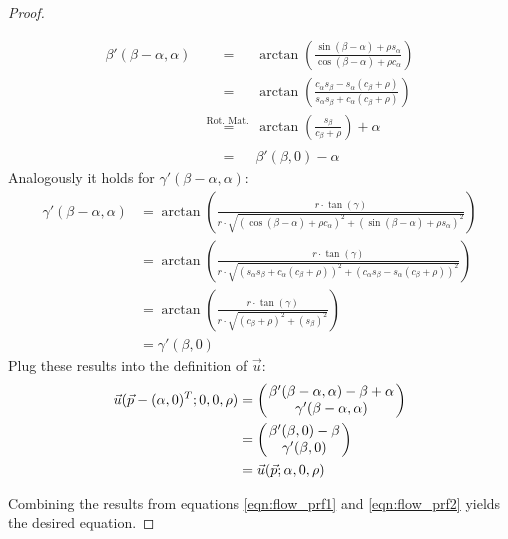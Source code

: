 \begin{proof}
\begin{enumerate}[1.]
\begin{align*}
 \beta'(\beta - \alpha, \alpha) &{\overset{\phantom{\text{Rot. Mat.}\;}}=} \arctan
    \left(
      \frac{
	  \sin(\beta - \alpha) + \rho s_{\alpha}
      }{
          \cos(\beta - \alpha) + \rho c_{\alpha}
      }
    \right) \\
    &{\overset{\phantom{\text{Rot. Mat.}\;}}=} \arctan
    \left(
      \frac{
	  c_\alpha s_\beta - s_\alpha (c_\beta + \rho)
      }{
	  s_\alpha s_\beta + c_\alpha (c_\beta + \rho)
      }
    \right) \\
    &{\overset{\text{Rot. Mat.}\;}=} \arctan
    \left(
      \frac{
	  s_\beta
      }{
	  c_\beta + \rho
      }
    \right) + \alpha \\
    &{\overset{\phantom{\text{Rot. Mat.}\;}}=} \beta'(\beta, 0) - \alpha
\end{align*}
Analogously it holds for $\gamma'(\beta - \alpha, \alpha)$:
\begin{align*}
  \gamma'(\beta - \alpha, \alpha) &= \arctan
    \left(
      \frac{
	r \cdot \tan(\gamma)
      }{
	r \cdot \sqrt{
	  (  \cos(\beta - \alpha) + \rho c_{\alpha} )^{2} +
	  (  \sin(\beta - \alpha) + \rho s_{\alpha})^{2}}
      }
    \right) \\
    &= \arctan
    \left(
      \frac{
	r \cdot \tan(\gamma)
      }{
	r \cdot \sqrt{
	  (  s_\alpha s_\beta + c_\alpha (c_\beta + \rho) )^{2} +
	  (  c_\alpha s_\beta - s_\alpha (c_\beta + \rho) )^{2}}
      }
    \right) \\
    &= \arctan
    \left(
      \frac{
	r \cdot \tan(\gamma)
      }{
	r \cdot \sqrt{
	  (  c_\beta + \rho )^{2} +
	  (  s_\beta )^{2}}
      }
    \right) \\
    &= \gamma'(\beta, 0)
\end{align*}
Plug these results into the definition of $\vec u$:
\begin{align}
\begin{aligned}
\vec u(\vec p - (\alpha, 0)^T; 0, 0, \rho) &= \begmat
    \beta'(\beta - \alpha, \alpha) - \beta + \alpha \\
    \gamma'(\beta - \alpha, \alpha)
  \finmat \\
  &= \begmat
    \beta'(\beta, 0) - \beta \\
    \gamma'(\beta, 0)
  \finmat \\
  &= \vec u(\vec p; \alpha, 0, \rho)
\end{aligned}
\label{eqn:flow_prf2}
\end{align}
\end{enumerate}
Combining the results from equations \ref{eqn:flow_prf1} and \ref{eqn:flow_prf2} yields the desired equation.
\end{proof}

